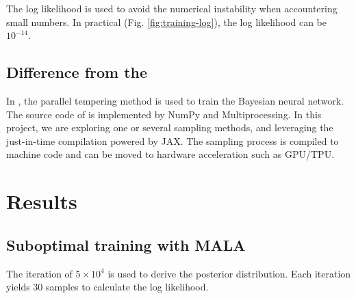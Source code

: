 \documentclass{article}
\begin{document}
The log likelihood is used to avoid the numerical instability when accountering small numbers. In practical (Fig. \ref{fig:training-log}), the log likelihood can be $10^{-14}$. 

\subsection{Difference from the \cite{chandra2021bayesian}}

In \cite{chandra2021bayesian}, the parallel tempering method is used to train the Bayesian neural network. The source code of \cite{chandra2019langevin} is implemented by NumPy and Multiprocessing. In this project, we are exploring one or several sampling methods, and leveraging the just-in-time compilation powered by JAX\cite{jax2018github}. The sampling process is compiled to machine code and can be moved to hardware acceleration such as GPU/TPU.


\section{Results}

\subsection{Suboptimal training with MALA}

The iteration of $5\times 10^4$ is used to derive the posterior distribution. Each iteration yields $30$ samples to calculate the log likelihood.
\end{document}
